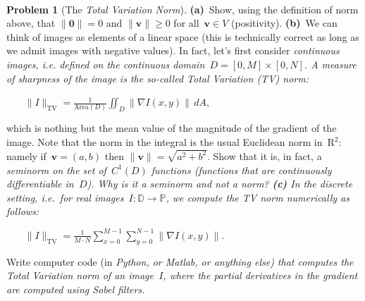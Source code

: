 \documentclass[11pt]{article}
\theoremstyle{plain}
\theoremstyle{definition}
\newtheorem{problem}{Problem}
\theoremstyle{remark}
\begin{document}
\hfill\mbox{ }
\par\vspace{.05cm}
\begin{problem}[The \em Total Variation \em Norm]
{\bf(a)}~Show, using the 
definition of norm above, that $\|\mathbf{0}\|=0$
and $\|\mathbf{v}\|\geq0$ for all~$\mathbf{v}\in V$ 
(positivity).
{\bf(b)}~We can think of images as elements of a linear 
space (this is technically correct as long as we admit images
with negative values). In fact, let's first consider
\em continuous images\em\/, i.e. defined on the 
continuous domain~$D=[0,M]\times[0,N]$.
A \em measure of sharpness \em of the image
is the so-called \em Total Variation \em (TV) norm: 
\par\vspace{-.35cm}\hfill\mbox{ }\hfill\mbox{ }\hfill\mbox{ }\hfill
$\displaystyle
\label{TVnorm}
\|I\|_\mathrm{TV}=\frac{1}{\mbox{Area}(D)}
\iint_D\|\nabla I(x,y)\|\,dA,
$\hfill\mbox{ }
\par\vspace{.10cm}
which is nothing but the mean value of the magnitude of the gradient
of the image.
Note that the norm in the integral is the usual
Euclidean norm in~$\mathrm{R}^2$: namely
if~$\mathbf{v}=(a,b)$
then $\|\mathbf{v}\|=\sqrt{a^2+b^2}$.
Show that it is, in fact, a \em seminorm \em 
on the set of~$C^1(D)$ functions (functions that are
continuously differentiable in~$D$). Why is it a 
seminorm and not a norm?
{\bf(c)} In the \em discrete \em setting, 
i.e.~for real images~$I:\mathbb{D}\rightarrow\mathbb{P}$,
we compute the TV norm numerically as follows:
\par\vspace{-.35cm}\hfill\mbox{ }\hfill\mbox{ }\hfill\mbox{ }\hfill
$\displaystyle
\|I\|_\mathrm{TV} = 
\frac{1}{M\cdot N}
\sum_{x=0}^{M-1}\sum_{y=0}^{N-1}\|\nabla I(x,y)\|.
$\hfill\mbox{ }
\par\vspace{.1cm}
Write computer code (in \em Python\em\/, or 
 \em Matlab\em\/, or anything else) that computes the Total Variation norm of an
image~$I$, where the partial derivatives in the gradient are computed
using  Sobel filters.
\end{problem}
\end{document}
